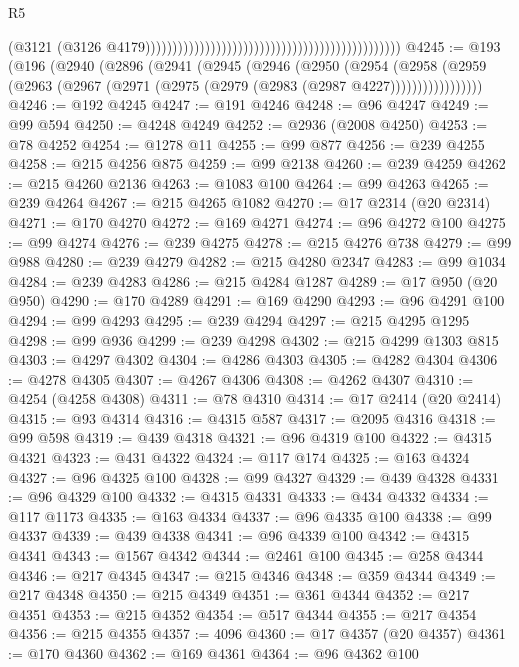 \begin{lexlean}{R5}
\begin{coremodule}
                                                                                              (@3121
                                                                                                (@3126
                                                                                                  @4179)))))))))))))))))))))))))))))))))))))))))))))))
@4245 := @193
    (@196
      (@2940
        (@2896
          (@2941
            (@2945
              (@2946
                (@2950
                  (@2954
                    (@2958
                      (@2959 (@2963 (@2967 (@2971 (@2975 (@2979 (@2983 (@2987 @4227)))))))))))))))))
@4246 := @192 @4245
@4247 := @191 @4246
@4248 := @96 @4247
@4249 := @99 @594
@4250 := @4248 @4249
@4252 := @2936 (@2008 @4250)
@4253 := @78 @4252
@4254 := @1278 @11
@4255 := @99 @877
@4256 := @239 @4255
@4258 := @215 @4256 @875
@4259 := @99 @2138
@4260 := @239 @4259
@4262 := @215 @4260 @2136
@4263 := @1083 @100
@4264 := @99 @4263
@4265 := @239 @4264
@4267 := @215 @4265 @1082
@4270 := @17 @2314 (@20 @2314)
@4271 := @170 @4270
@4272 := @169 @4271
@4274 := @96 @4272 @100
@4275 := @99 @4274
@4276 := @239 @4275
@4278 := @215 @4276 @738
@4279 := @99 @988
@4280 := @239 @4279
@4282 := @215 @4280 @2347
@4283 := @99 @1034
@4284 := @239 @4283
@4286 := @215 @4284 @1287
@4289 := @17 @950 (@20 @950)
@4290 := @170 @4289
@4291 := @169 @4290
@4293 := @96 @4291 @100
@4294 := @99 @4293
@4295 := @239 @4294
@4297 := @215 @4295 @1295
@4298 := @99 @936
@4299 := @239 @4298
@4302 := @215 @4299 @1303 @815
@4303 := @4297 @4302
@4304 := @4286 @4303
@4305 := @4282 @4304
@4306 := @4278 @4305
@4307 := @4267 @4306
@4308 := @4262 @4307
@4310 := @4254 (@4258 @4308)
@4311 := @78 @4310
@4314 := @17 @2414 (@20 @2414)
@4315 := @93 @4314
@4316 := @4315 @587
@4317 := @2095 @4316
@4318 := @99 @598
@4319 := @439 @4318
@4321 := @96 @4319 @100
@4322 := @4315 @4321
@4323 := @431 @4322
@4324 := @117 @174
@4325 := @163 @4324
@4327 := @96 @4325 @100
@4328 := @99 @4327
@4329 := @439 @4328
@4331 := @96 @4329 @100
@4332 := @4315 @4331
@4333 := @434 @4332
@4334 := @117 @1173
@4335 := @163 @4334
@4337 := @96 @4335 @100
@4338 := @99 @4337
@4339 := @439 @4338
@4341 := @96 @4339 @100
@4342 := @4315 @4341
@4343 := @1567 @4342
@4344 := @2461 @100
@4345 := @258 @4344
@4346 := @217 @4345
@4347 := @215 @4346
@4348 := @359 @4344
@4349 := @217 @4348
@4350 := @215 @4349
@4351 := @361 @4344
@4352 := @217 @4351
@4353 := @215 @4352
@4354 := @517 @4344
@4355 := @217 @4354
@4356 := @215 @4355
@4357 := 4096
@4360 := @17 @4357 (@20 @4357)
@4361 := @170 @4360
@4362 := @169 @4361
@4364 := @96 @4362 @100

\end{coremodule}
\end{lexlean}
